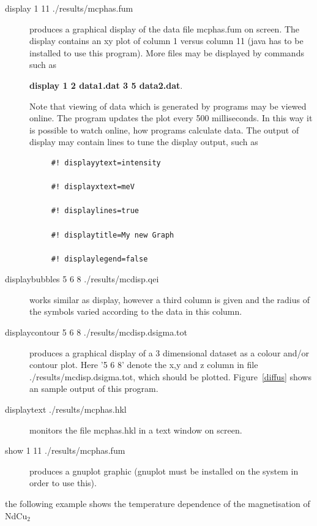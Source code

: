 \begin{description} 
\item [display 1 11 ./results/mcphas.fum] produces a graphical display of the data %
file
mcphas.fum on screen. The display contains an xy plot of column 1 versus column 11
({\prg java} has to be installed to use this program). 
More files may be displayed by commands such as

{\bf display 1 2 data1.dat 3 5 data2.dat}.

Note that viewing of 
data which is generated by programs may be viewed online. The program updates the plot
every 500 milliseconds. In this way it is possible to watch online, how programs
calculate data. The output of display may contain lines to tune the display output, %
such as
\begin{verbatim}
	 #! displayytext=intensity

	 #! displayxtext=meV 

	 #! displaylines=true 

	 #! displaytitle=My new Graph

	 #! displaylegend=false 
\end{verbatim} 

\item [displaybubbles  5 6 8 ./results/mcdisp.qei] works similar as display, however
a third column is given and the radius of the symbols varied according to the data in 
this column.

\item [displaycontour 5 6 8 ./results/mcdisp.dsigma.tot] produces a graphical
display of a 3 dimensional dataset as a colour and/or contour plot. Here '5 6 8' 
denote the x,y and z column in file {\prg ./results/mcdisp.dsigma.tot}, which should
be plotted. Figure~\ref{diffus} shows an sample output of this program.

\item [displaytext ./results/mcphas.hkl] monitors the file mcphas.hkl in a text window
on screen.

\item [show 1 11 ./results/mcphas.fum]     produces a gnuplot graphic 
({\prg gnuplot} must be installed
on the system in order to use this).
\end{description} 
the following example shows the temperature dependence of the magnetisation
of NdCu$_2$

